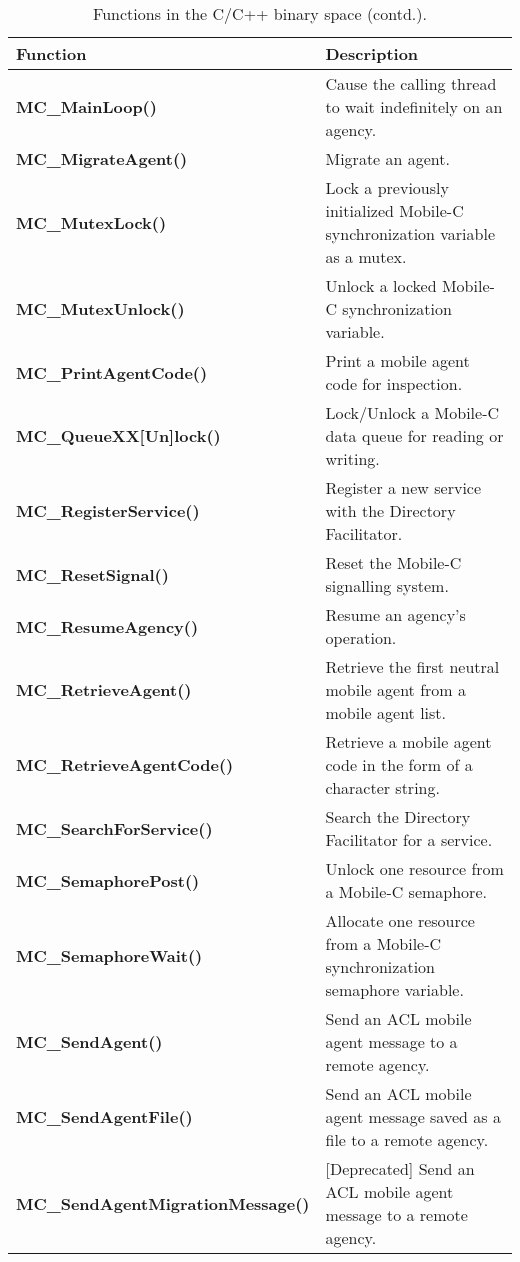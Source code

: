 \addtocounter{table}{-1}
\begin{table}[!hp]
\capstart
\begin{center}
\caption{Functions in the C/C++ binary space (contd.).}
\begin{tabular}{p{63 mm}p{97 mm}}
\hline
Function & Description \\
\hline
{\bf MC\_MainLoop()} \dotfill & Cause the calling thread to wait indefinitely on an agency.\\
{\bf MC\_MigrateAgent()} \dotfill & Migrate an agent. \\
{\bf MC\_MutexLock()} \dotfill & Lock a previously initialized Mobile-C synchronization variable as a mutex. \\
{\bf MC\_MutexUnlock()} \dotfill & Unlock a locked Mobile-C synchronization variable. \\
{\bf MC\_PrintAgentCode()} \dotfill & Print a mobile agent code for inspection. \\
{\bf MC\_QueueXX[Un]lock()} \dotfill & Lock/Unlock a Mobile-C data queue for reading or writing. \\
{\bf MC\_RegisterService()} \dotfill &  Register a new service with the Directory Facilitator. \\
{\bf MC\_ResetSignal()} \dotfill &  Reset the Mobile-C signalling system. \\
{\bf MC\_ResumeAgency()} \dotfill &  Resume an agency's operation. \\
{\bf MC\_RetrieveAgent()} \dotfill & Retrieve the first neutral mobile agent from a mobile agent list. \\
{\bf MC\_RetrieveAgentCode()} \dotfill & Retrieve a mobile agent code in the form of a character string. \\
{\bf MC\_SearchForService()} \dotfill & Search the Directory Facilitator for a service. \\
{\bf MC\_SemaphorePost()} \dotfill & Unlock one resource from a Mobile-C semaphore. \\
{\bf MC\_SemaphoreWait()} \dotfill & Allocate one resource from a Mobile-C synchronization semaphore variable. \\
{\bf MC\_SendAgent()} \dotfill & Send an ACL mobile agent message to a remote agency. \\
{\bf MC\_SendAgentFile()} \dotfill & Send an ACL mobile agent message saved as a file to a remote agency. \\
{\bf MC\_SendAgentMigrationMessage()} \dotfill & [Deprecated] Send an ACL mobile agent message to a remote agency. \\

\end{tabular}
\end{center}
\end{table}
